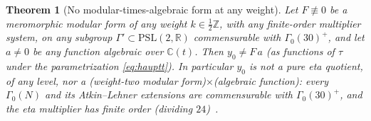 \documentclass[cntp]{ipart}
\theoremstyle{plain}
\newtheorem{thm}{Theorem}[section]
\theoremstyle{remark}
\begin{document}
\begin{thm}[No modular-times-algebraic form at any weight]\label{thm:noalg}
Let $F\not\equiv0$ be a
meromorphic modular form of any weight $k\in\tfrac12\mathbb{Z}$, with any finite-order
multiplier system, on any subgroup $\Gamma'\subset\mathrm{PSL}(2,\mathbb{R})$ commensurable
with $\Gamma_0(30)^+$, and let $a\neq0$ be any function algebraic over $\mathbb{C}(t)$. Then
$y_0\neq F\,a$ (as functions of $\tau$ under the parametrization \eqref{eq:hauptt}). In
particular $y_0$ is not a pure eta quotient, of any level, nor a (weight-two modular
form)$\times$(algebraic function): every $\Gamma_0(N)$ and its Atkin--Lehner extensions are
commensurable with $\Gamma_0(30)^+$, and the eta multiplier has finite order (dividing
$24$)~\cite{DiamondShurman,Ligozat1975}.
\end{thm}
\end{document}
